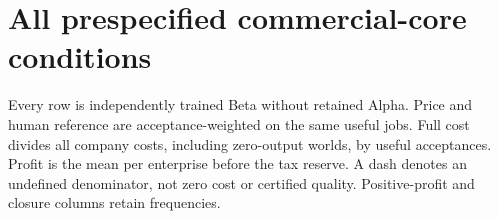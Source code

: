 \section{All prespecified commercial-core conditions}\label{app:commercial-core-conditions}

Every row is independently trained Beta without retained Alpha. Price and human reference are acceptance-weighted on the same useful jobs. Full cost divides all company costs, including zero-output worlds, by useful acceptances. Profit is the mean per enterprise before the tax reserve. A dash denotes an undefined denominator, not zero cost or certified quality. Positive-profit and closure columns retain frequencies.

{\scriptsize\setlength{\tabcolsep}{3pt}

\resizebox{\linewidth}{!}{%

}}
